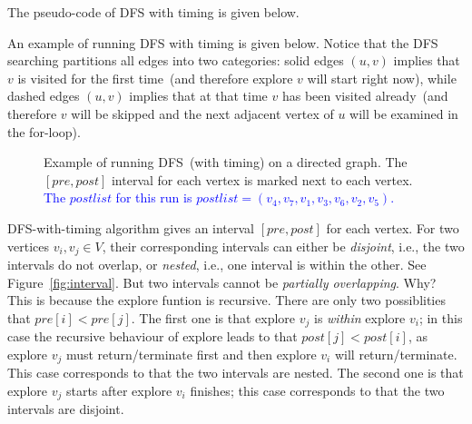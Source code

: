 The pseudo-code of DFS with timing is given below.

\begin{minipage}{0.8\textwidth}
	\xxx
	\xxx
	\xxx
	\xxx
	\xxx
	\xxx
\end{minipage}

\begin{minipage}{0.8\textwidth}
	\xxx
	\xxx
	\xxx
	\xxx
	\xxx
	\xxx
	\xxx
	\xxx
	\xxx
	\xxx
	\xxx
\end{minipage}

An example of running DFS with timing is given below.
Notice that the DFS searching partitions all edges into two categories:
solid edges $(u,v)$ implies that $v$ is visited for the first time~(and therefore explore $v$ will start right now),
while dashed edges $(u,v)$ implies that at that time $v$ has been visited already~(and therefore $v$ will be skipped and the next adjacent
vertex of $u$ will be examined in the for-loop). 

\begin{figure}[h!]
\centering{}
\caption{Example of running DFS~(with timing) on a directed graph. 
The $[pre,post]$ interval for each vertex
is marked next to each vertex. 
\textcolor{blue}{The $postlist$ for this run is $postlist = (v_4,v_7,v_1,v_3,v_6,v_2,v_5)$.}}
\end{figure}

DFS-with-timing algorithm gives an interval $[pre,post]$ for each vertex.
For two vertices $v_i,v_j\in V$, their corresponding intervals can either be
\emph{disjoint}, i.e., the two intervals do not overlap, or \emph{nested}, i.e.,
one interval is within the other. See Figure~\ref{fig:interval}.
But two intervals cannot be \emph{partially overlapping}. Why? This is because
the explore funtion is recursive. There are only two possiblities
that $pre[i] < pre[j]$. The first one is that explore $v_j$ is \emph{within} explore $v_i$;
in this case the recursive behaviour of explore leads to that $post[j] < post[i]$,
as explore $v_j$ must return/terminate first and then explore $v_i$ will return/terminate.
This case corresponds to that the two intervals are nested.
The second one is that explore $v_j$ starts after explore $v_i$ finishes;
this case corresponds to that the two intervals are disjoint.


